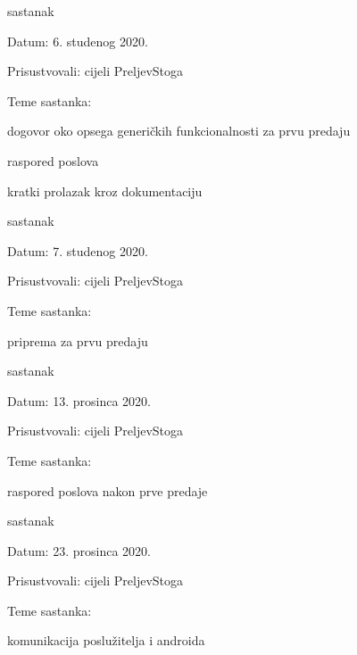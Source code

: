 \begin{packed_enum}
			\item  sastanak
			\item[] \begin{packed_item}
				\item Datum: 6. studenog 2020.
				\item Prisustvovali: cijeli PreljevStoga
				\item Teme sastanka:
				\begin{packed_item}
					\item  dogovor oko opsega generičkih funkcionalnosti za prvu predaju
					\item  raspored poslova
					\item  kratki prolazak kroz dokumentaciju
				\end{packed_item}
			\end{packed_item}
			
			\item  sastanak
			\item[] \begin{packed_item}
				\item Datum: 7. studenog 2020.
				\item Prisustvovali: cijeli PreljevStoga
				\item Teme sastanka:
				\begin{packed_item}
					\item  priprema za prvu predaju
				\end{packed_item}
			\end{packed_item}
			
			\item  sastanak
			\item[] \begin{packed_item}
				\item Datum: 13. prosinca 2020.
				\item Prisustvovali: cijeli PreljevStoga
				\item Teme sastanka:
				\begin{packed_item}
					\item  raspored poslova nakon prve predaje
				\end{packed_item}
			\end{packed_item}
			
			\item  sastanak
			\item[] \begin{packed_item}
				\item Datum: 23. prosinca 2020.
				\item Prisustvovali: cijeli PreljevStoga
				\item Teme sastanka:
				\begin{packed_item}
					\item  komunikacija poslužitelja i androida
				\end{packed_item}
			\end{packed_item}
			

\end{packed_enum}
